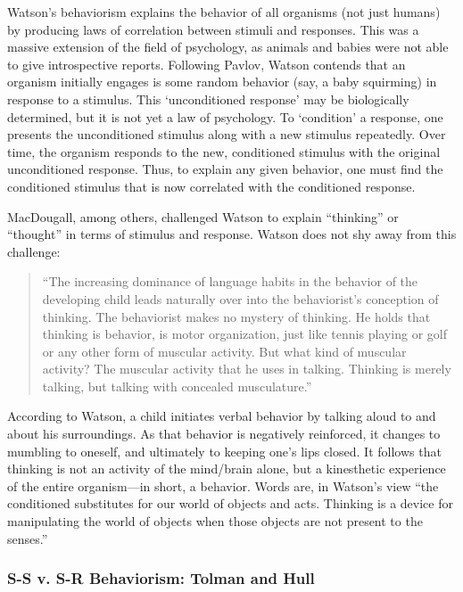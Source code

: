\begin{refsection}
Watson's behaviorism explains the behavior of all organisms (not just humans) by producing laws of correlation between stimuli and responses. This was a massive extension of the field of psychology, as animals and babies were not able to give introspective reports. Following Pavlov, Watson contends that an organism initially engages is some random behavior (say, a baby squirming) in response to a stimulus. This `unconditioned response' may be biologically determined, but it is not yet a law of psychology. To `condition' a response, one presents the unconditioned stimulus along with a new stimulus repeatedly. Over time, the organism responds to the new, conditioned stimulus with the original unconditioned response. Thus, to explain any given behavior, one must find the conditioned stimulus that is now correlated with the conditioned response.

MacDougall, among others, challenged Watson to explain ``thinking'' or ``thought'' in terms of stimulus and response. Watson does not shy away from this challenge:

\begin{quote}

``The increasing dominance of language habits in the behavior of the developing child leads naturally over into the behaviorist's conception of thinking. The behaviorist makes no mystery of thinking. He holds that thinking is behavior, is motor organization, just like tennis playing or golf or any other form of muscular activity. But what kind of muscular activity? The muscular activity that he uses in talking. Thinking is merely talking, but talking with concealed musculature.'' ~\citep[p. 464]{Watson:2013ty}
\end{quote}

According to Watson, a child initiates verbal behavior by talking aloud to and about his surroundings. As that behavior is negatively reinforced, it changes to mumbling to oneself, and ultimately to keeping one's lips closed. It follows that thinking is not an activity of the mind\slash brain alone, but a kinesthetic experience of the entire organism---in short, a behavior. Words are, in Watson's view ``the conditioned substitutes for our world of objects and acts. Thinking is a device for manipulating the world of objects when those objects are not present to the senses.'' ~\citep{Watson:iMwU-3B8}

\subsubsection{S-S v. S-R Behaviorism: Tolman and Hull}
\label{s-sv.s-rbehaviorism:tolmanandhull}


\end{refsection}
